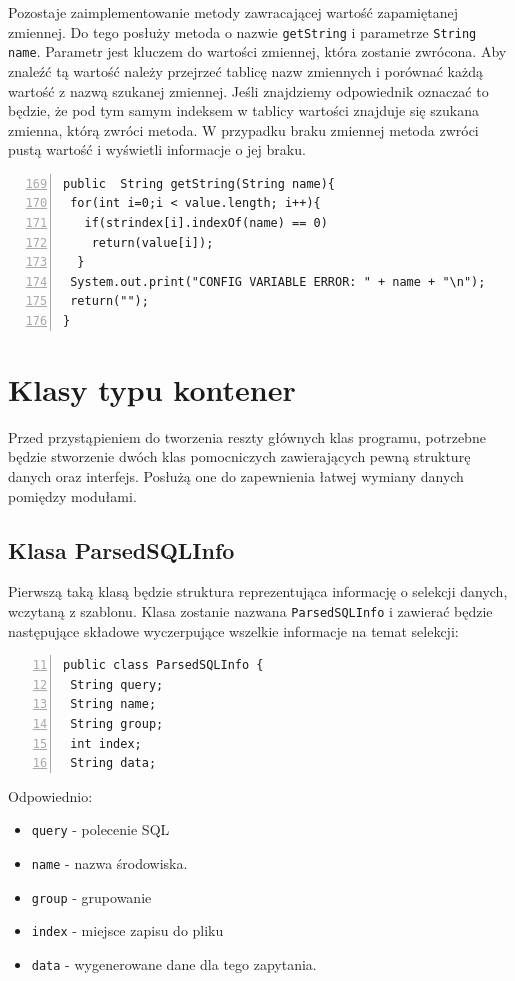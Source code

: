 Pozostaje zaimplementowanie metody zawracającej wartość zapamiętanej zmiennej. Do tego posłuży metoda o nazwie \texttt{getString} i parametrze \texttt{String name}. Parametr jest kluczem do wartości zmiennej, która zostanie zwrócona.  Aby znaleźć tą wartość należy przejrzeć tablicę nazw zmiennych i porównać każdą wartość z nazwą szukanej zmiennej. Jeśli znajdziemy odpowiednik oznaczać to będzie, że pod tym samym indeksem w tablicy wartości znajduje się szukana zmienna, którą zwróci metoda. W przypadku braku zmiennej metoda zwróci pustą wartość i wyświetli informacje o jej braku.

\begin{lstlisting}[numbers=left,firstnumber=169]
public  String getString(String name){
 for(int i=0;i < value.length; i++){
   if(strindex[i].indexOf(name) == 0)
    return(value[i]);
  }
 System.out.print("CONFIG VARIABLE ERROR: " + name + "\n");
 return("");
}
\end{lstlisting}

\section{Klasy typu kontener}

Przed przystąpieniem do tworzenia reszty głównych klas programu, potrzebne będzie stworzenie dwóch klas pomocniczych zawierających pewną strukturę danych oraz interfejs. Posłużą one do zapewnienia łatwej wymiany danych pomiędzy modułami. 

\subsection{Klasa ParsedSQLInfo}

Pierwszą taką klasą będzie struktura reprezentująca informację o selekcji danych, wczytaną z szablonu. Klasa zostanie nazwana \texttt{ParsedSQLInfo} i zawierać będzie następujące składowe wyczerpujące wszelkie informacje na temat selekcji:

\begin{lstlisting}[numbers=left,firstnumber=11]
public class ParsedSQLInfo {
 String query;
 String name;
 String group;
 int index;
 String data;
\end{lstlisting}
Odpowiednio:
    \begin{itemize}
    \item \texttt{query} - polecenie SQL
    \item \texttt{name} - nazwa środowiska.
    \item \texttt{group} - grupowanie
    \item \texttt{index} - miejsce zapisu do pliku
    \item \texttt{data} - wygenerowane dane dla tego zapytania.
    \end{itemize}

